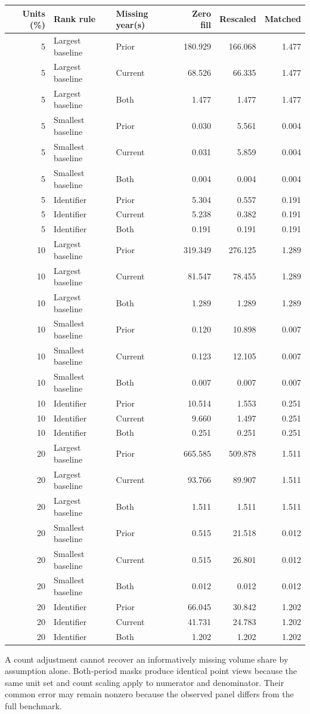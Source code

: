 \documentclass[11pt]{article}
\begin{document}
\begin{center}\small\setlength{\tabcolsep}{4pt}
\begin{tabular}{rllrrr}\toprule
Units (\%) & Rank rule & Missing year(s) & Zero fill & Rescaled & Matched \\
\midrule
5 & Largest baseline & Prior & 180.929 & 166.068 & 1.477 \\
5 & Largest baseline & Current & 68.526 & 66.335 & 1.477 \\
5 & Largest baseline & Both & 1.477 & 1.477 & 1.477 \\
5 & Smallest baseline & Prior & 0.030 & 5.561 & 0.004 \\
5 & Smallest baseline & Current & 0.031 & 5.859 & 0.004 \\
5 & Smallest baseline & Both & 0.004 & 0.004 & 0.004 \\
5 & Identifier & Prior & 5.304 & 0.557 & 0.191 \\
5 & Identifier & Current & 5.238 & 0.382 & 0.191 \\
5 & Identifier & Both & 0.191 & 0.191 & 0.191 \\
10 & Largest baseline & Prior & 319.349 & 276.125 & 1.289 \\
10 & Largest baseline & Current & 81.547 & 78.455 & 1.289 \\
10 & Largest baseline & Both & 1.289 & 1.289 & 1.289 \\
10 & Smallest baseline & Prior & 0.120 & 10.898 & 0.007 \\
10 & Smallest baseline & Current & 0.123 & 12.105 & 0.007 \\
10 & Smallest baseline & Both & 0.007 & 0.007 & 0.007 \\
10 & Identifier & Prior & 10.514 & 1.553 & 0.251 \\
10 & Identifier & Current & 9.660 & 1.497 & 0.251 \\
10 & Identifier & Both & 0.251 & 0.251 & 0.251 \\
20 & Largest baseline & Prior & 665.585 & 509.878 & 1.511 \\
20 & Largest baseline & Current & 93.766 & 89.907 & 1.511 \\
20 & Largest baseline & Both & 1.511 & 1.511 & 1.511 \\
20 & Smallest baseline & Prior & 0.515 & 21.518 & 0.012 \\
20 & Smallest baseline & Current & 0.515 & 26.801 & 0.012 \\
20 & Smallest baseline & Both & 0.012 & 0.012 & 0.012 \\
20 & Identifier & Prior & 66.045 & 30.842 & 1.202 \\
20 & Identifier & Current & 41.731 & 24.783 & 1.202 \\
20 & Identifier & Both & 1.202 & 1.202 & 1.202 \\
\bottomrule\end{tabular}\end{center}
A count adjustment cannot recover an informatively missing volume share by assumption alone. Both-period masks produce identical point views because the same unit set and count scaling apply to numerator and denominator. Their common error may remain nonzero because the observed panel differs from the full benchmark.
\end{document}
